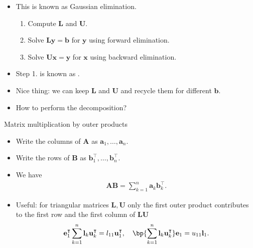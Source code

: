 \documentclass[11pt,xcolor={dvipsnames},aspectratio=159,hyperref={pdftex,pdfpagemode=UseNone,hidelinks,pdfdisplaydoctitle=true},usepdftitle=false]{beamer}
\begin{document}
\begin{frame} 
    \begin{itemize} 
        \item This is known as Gaussian elimination.
        \begin{enumerate}
        \item Compute $\mathbf{L}$ and $\mathbf{U}$.
        \item Solve $\mathbf{L} \mathbf{y} = \mathbf{b}$ for $\mathbf{y}$ using forward elimination.
        \item Solve $\mathbf{U} \mathbf{x} = \mathbf{y}$ for $\mathbf{x}$ using backward elimination.
        \end{enumerate}
        \item Step 1. is known as .
        \item Nice thing: we can keep $\mathbf{L}$ and $\mathbf{U}$ and recycle them for different $\mathbf{b}$.
        \item How to perform the decomposition?
    \end{itemize}
    \end{frame}


\begin{frame}{Matrix multiplication by outer products}
\begin{itemize}
    \item Write the columns of $\mathbf{A}$ as $\mathbf{a}_1, \ldots, \mathbf{a}_n$.
    \item Write the rows of $\mathbf{B}$ as $\mathbf{b}^\intercal_1, \ldots, \mathbf{b}^\intercal_n$.
    \item We have \begin{align*}
        \mathbf{A}\mathbf{B} = \sum_{k=1}^n \mathbf{a}_k \mathbf{b}^\intercal_k.
    \end{align*}
    \item Useful: for triangular matrices $\mathbf{L},\mathbf{U}$ only the first outer product contributes to the first row and the first column of $\mathbf{L} \mathbf{U}$
    \begin{align*}
        \mathbf{e}^\intercal_1 \sum_{k=1}^n \mathbf{l}_k \mathbf{u}^\intercal_k = l_{11} \mathbf{u}^\intercal_1, \quad \bp{\sum_{k=1}^n \mathbf{l}_k \mathbf{u}^\intercal_k} \mathbf{e}_1 = u_{11} \mathbf{l}_1.
    \end{align*}
\end{itemize}

\end{frame}
\end{document}
